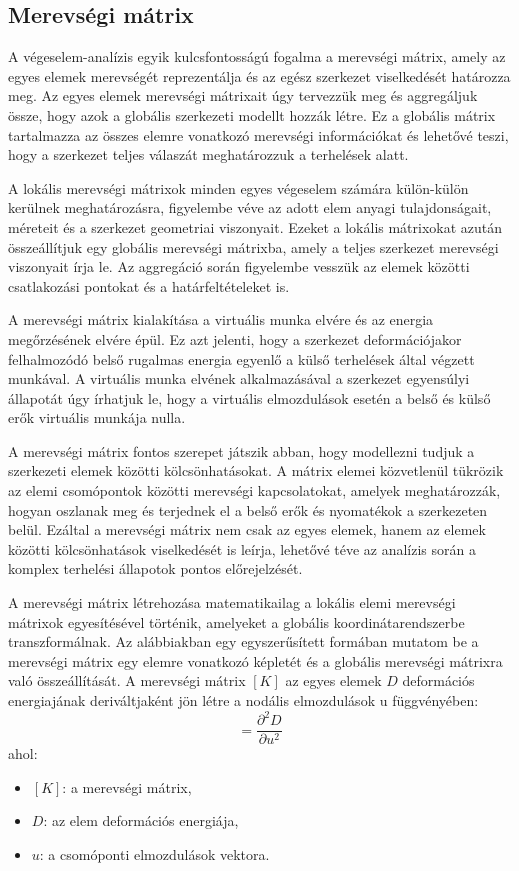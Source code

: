 \documentclass[12pt,a4paper,oneside]{report}
\begin{document}
\subsection{Merevségi mátrix}
A végeselem-analízis egyik kulcsfontosságú fogalma a merevségi mátrix, amely az egyes elemek merevségét reprezentálja és az egész szerkezet viselkedését határozza meg. Az egyes elemek merevségi mátrixait úgy tervezzük meg és aggregáljuk össze, hogy azok a globális szerkezeti modellt hozzák létre. Ez a globális mátrix tartalmazza az összes elemre vonatkozó merevségi információkat és lehetővé teszi, hogy a szerkezet teljes válaszát meghatározzuk a terhelések alatt.

A lokális merevségi mátrixok minden egyes végeselem számára külön-külön kerülnek meghatározásra, figyelembe véve az adott elem anyagi tulajdonságait, méreteit és a szerkezet geometriai viszonyait. Ezeket a lokális mátrixokat azután összeállítjuk egy globális merevségi mátrixba, amely a teljes szerkezet merevségi viszonyait írja le. Az aggregáció során figyelembe vesszük az elemek közötti csatlakozási pontokat és a határfeltételeket is.

A merevségi mátrix kialakítása a virtuális munka elvére és az energia megőrzésének elvére épül. Ez azt jelenti, hogy a szerkezet deformációjakor felhalmozódó belső rugalmas energia egyenlő a külső terhelések által végzett munkával. A virtuális munka elvének alkalmazásával a szerkezet egyensúlyi állapotát úgy írhatjuk le, hogy a virtuális elmozdulások esetén a belső és külső erők virtuális munkája nulla.

A merevségi mátrix fontos szerepet játszik abban, hogy modellezni tudjuk a szerkezeti elemek közötti kölcsönhatásokat. A mátrix elemei közvetlenül tükrözik az elemi csomópontok közötti merevségi kapcsolatokat, amelyek meghatározzák, hogyan oszlanak meg és terjednek el a belső erők és nyomatékok a szerkezeten belül. Ezáltal a merevségi mátrix nem csak az egyes elemek, hanem az elemek közötti kölcsönhatások viselkedését is leírja, lehetővé téve az analízis során a komplex terhelési állapotok pontos előrejelzését.

A merevségi mátrix létrehozása matematikailag a lokális elemi merevségi mátrixok egyesítésével történik, amelyeket a globális koordinátarendszerbe transzformálnak. Az alábbiakban egy egyszerűsített formában mutatom be a merevségi mátrix egy elemre vonatkozó képletét és a globális merevségi mátrixra való összeállítását. A merevségi mátrix $[K]$ az egyes elemek $D$ deformációs energiajának deriváltjaként jön létre a nodális elmozdulások u függvényében:
\begin{equation}
    [K] = \dfrac{\partial^2 D}{\partial u^2}
\end{equation}
ahol:
\begin{itemize}
    \item $[K]$: a merevségi mátrix,
    \item $D$: az elem deformációs energiája,
    \item $u$: a csomóponti elmozdulások vektora.
\end{itemize}
\end{document}
